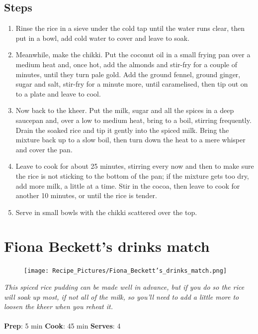 \documentclass{book}
\begin{document}
\subsection*{Steps}
\begin{enumerate}
\item Rinse the rice in a sieve under the cold tap until the water runs clear, then put in a bowl, add cold water to cover and leave to soak.
\item Meanwhile, make the chikki. Put the coconut oil in a small frying pan over a medium heat and, once hot, add the almonds and stir-fry for a couple of minutes, until they turn pale gold. Add the ground fennel, ground ginger, sugar and salt, stir-fry for a minute more, until caramelised, then tip out on to a plate and leave to cool.
\item Now back to the kheer. Put the milk, sugar and all the spices in a deep saucepan and, over a low to medium heat, bring to a boil, stirring frequently. Drain the soaked rice and tip it gently into the spiced milk. Bring the mixture back up to a slow boil, then turn down the heat to a mere whisper and cover the pan.
\item Leave to cook for about 25 minutes, stirring every now and then to make sure the rice is not sticking to the bottom of the pan; if the mixture gets too dry, add more milk, a little at a time. Stir in the cocoa, then leave to cook for another 10 minutes, or until the rice is tender.
\item Serve in small bowls with the chikki scattered over the top.
\end{enumerate}
\newpage

\section{Fiona Beckett’s drinks match}
\begin{figure}
\centering\texttt{[image: Recipe\_Pictures/Fiona\_Beckett’s\_drinks\_match.png]}
\end{figure}
\emph{This spiced rice pudding can be made well in advance, but if you do so the rice will soak up most, if not all of the milk, so you’ll need to add a little more to loosen the kheer when you reheat it.}\\\\ 
\textbf{Prep}: 5 min
\textbf{Cook}: 45 min
\textbf{Serves}: 4
\end{document}

